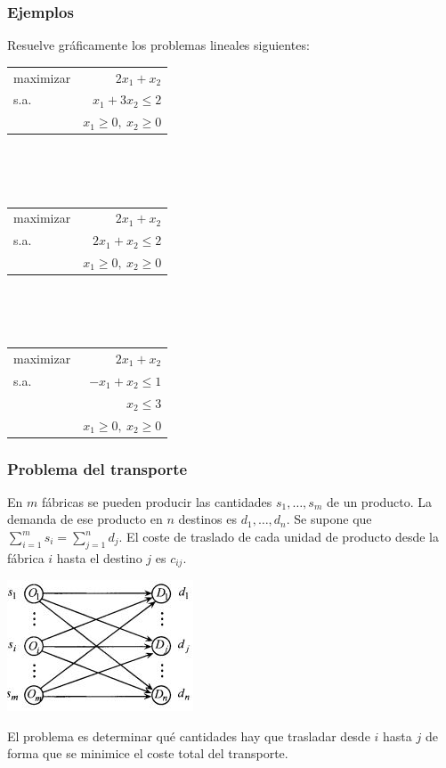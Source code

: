 \documentclass{beamer}
\begin{document}
\begin{frame}
\frametitle{Ejemplos}

Resuelve gráficamente los problemas lineales siguientes:

\begin{center}
\begin{tabular}{lr}
maximizar & $2x_1 + x_2$ \\
s.a. & $x_1+3x_2 \leq 2$    \\
	 & $x_1\geq 0,\ x_2\geq 0$
\end{tabular}
\end{center}

\

\

\begin{center}
\begin{tabular}{lr}
maximizar & $2x_1 + x_2$ \\
s.a. & $2x_1+x_2 \leq 2$    \\
	 & $x_1\geq 0,\ x_2\geq 0$
\end{tabular}
\end{center}

\

\

\begin{center}
\begin{tabular}{lr}
maximizar & $2x_1 + x_2$ \\
s.a. & $-x_1+x_2 \leq 1$    \\
	& $x_2\leq 3$	\\
	 & $x_1\geq 0,\ x_2\geq 0$
\end{tabular}
\end{center}


\end{frame}
\begin{frame}
\frametitle{Problema del transporte}

En $m$ fábricas se pueden producir las cantidades $s_1,\ldots, s_m$ de un producto. La demanda de ese producto en $n$ destinos es $d_1,\ldots, d_n$. Se supone que $\sum_{i=1}^m s_i=\sum_{j=1}^n d_j$. El coste de traslado de cada unidad de producto desde la fábrica $i$ hasta el destino $j$ es $c_{ij}$. 


\begin{center}
\includegraphics[scale=1.2]{transporte}
\end{center}


El problema es determinar qué cantidades hay que trasladar desde $i$ hasta $j$ de forma que se minimice el coste total del transporte.

\end{frame}
\end{document}
